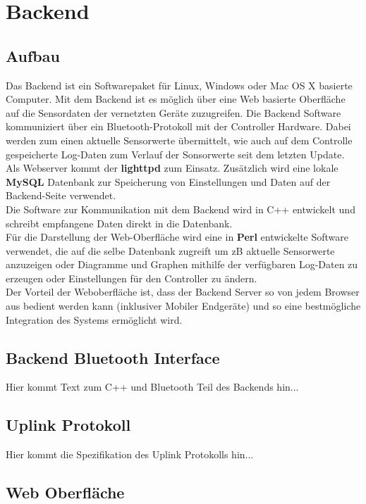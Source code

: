 \documentclass[12pt,a4paper]{article}
\begin{document}
\section{Backend}

\subsection{Aufbau}

Das Backend ist ein Softwarepaket für Linux, Windows oder Mac OS X basierte Computer. Mit dem Backend ist es möglich über eine Web basierte Oberfläche auf die Sensordaten der vernetzten Geräte zuzugreifen. Die Backend Software kommuniziert über ein Bluetooth-Protokoll mit der Controller Hardware. Dabei werden zum einen aktuelle Sensorwerte übermittelt, wie auch auf dem Controlle gespeicherte Log-Daten zum Verlauf der Sonsorwerte seit dem letzten Update.\\
Als Webserver kommt der {\bf lighttpd} zum Einsatz. Zusätzlich wird eine lokale {\bf MySQL} Datenbank zur Speicherung von Einstellungen und Daten auf der Backend-Seite verwendet.\\
Die Software zur Kommunikation mit dem Backend wird in C++ entwickelt und schreibt empfangene Daten direkt in die Datenbank.\\
Für die Darstellung der Web-Oberfläche wird eine in {\bf Perl} entwickelte Software verwendet, die auf die selbe Datenbank zugreift um zB aktuelle Sensorwerte anzuzeigen oder Diagramme und Graphen mithilfe der verfügbaren Log-Daten zu erzeugen oder Einstellungen für den Controller zu ändern.\\
Der Vorteil der Weboberfläche ist, dass der Backend Server so von jedem Browser aus bedient werden kann (inklusiver Mobiler Endgeräte) und so eine bestmögliche Integration des Systems ermöglicht wird.

\subsection{Backend Bluetooth Interface}

Hier kommt Text zum C++ und Bluetooth Teil des Backends hin...

\subsection{Uplink Protokoll}

Hier kommt die Spezifikation des Uplink Protokolls hin...

\subsection{Web Oberfläche}
\end{document}
